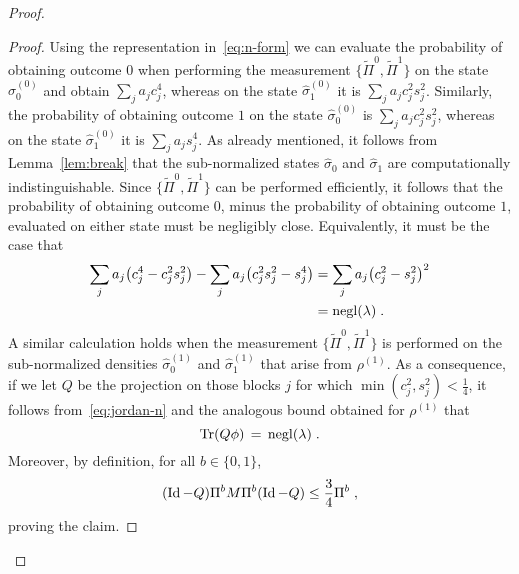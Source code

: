 \documentclass[11pt]{article}
\theoremstyle{remark}
\theoremstyle{definition}
\newcommand{\Tr}{\mbox{\rm Tr}}
\newcommand{\Id}{\ensuremath{\mathop{\rm Id}\nolimits}}
\DeclareMathOperator{\negl}{negl}
\begin{document}
\begin{proof}
\begin{proof}
Using the representation in~\eqref{eq:n-form} we can evaluate the probability of obtaining outcome $0$ when performing the measurement $\{\tilde{\Pi}^0,\tilde{\Pi}^1\}$ on the state $\hat{\sigma}_{0}^{(0)}$ and obtain $ \sum_j a_j c_j^4$, whereas on the state $\hat{\sigma}_1^{(0)}$ it is $ \sum_j a_j c_j^2s_j^2$. Similarly, the probability of obtaining outcome $1$ on the state $\hat{\sigma}_0^{(0)}$ is $ \sum_j a_j c_j^2 s_j^2$, whereas on the state $\hat{\sigma}_1^{(0)}$ it is $ \sum_j a_j s_j^4$. As already mentioned, it follows from Lemma~\ref{lem:break} that the sub-normalized states $\hat{\sigma}_{0}$ and $\hat{\sigma}_{1}$ are computationally indistinguishable. Since $\{\tilde{\Pi}^0,\tilde{\Pi}^1\}$ can be performed efficiently, it follows that the probability of obtaining outcome $0$, minus the probability of obtaining outcome $1$, evaluated on either state must be negligibly close. Equivalently, it must be the case that
\begin{align}
 \sum_j a_j\big(c_j^4 - c_j^2 s_j^2 \big) - \sum_j a_j\big( c_j^2 s_j^2 - s_j^4 \big)
&= \sum_j a_j\big(c_j^2 - s_j^2 \big)^2\notag\\
&= \negl(\lambda)\;.\label{eq:jordan-n}
\end{align}
A similar calculation holds when the measurement $\{\tilde{\Pi}^0,\tilde{\Pi}^1\}$ is performed on the sub-normalized densities $\hat{\sigma}_{0}^{(1)}$ and $\hat{\sigma}_{1}^{(1)}$ that arise from $\rho^{(1)}$. As a consequence, if we let $Q$ be the projection on those blocks $j$ for which $\min(c_j^2,s_j^2) < \frac{1}{4}$, it follows from~\eqref{eq:jordan-n} and the analogous bound obtained for $\rho^{(1)}$ that 
\begin{equation}\label{eq:q-negl}
 \Tr(Q \phi) \,=\, \negl(\lambda)\;.
\end{equation}
Moreover, by definition, for all $b\in\{0,1\}$, 
\begin{equation}\label{eq:q-norm}
(\Id-Q)\Pi^b M \Pi^b (\Id-Q) \leq \frac{3}{4} \Pi^b\;,
\end{equation}
proving the claim. 

\end{proof}
\end{proof}
\end{document}
